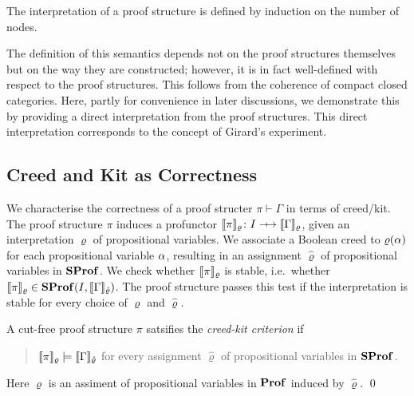 The interpretation of a proof structure is defined by induction on the number of nodes.

The definition of this semantics depends not on the proof structures themselves but on the way they are constructed; however, it is in fact well-defined with respect to the proof structures. This follows from the coherence of compact closed categories. Here, partly for convenience in later discussions, we demonstrate this by providing a direct interpretation from the proof structures. This direct interpretation corresponds to the concept of Girard's experiment.


\subsection{Creed and Kit as Correctness}
We characterise the correctness of a proof structer \( \pi \vdash \Gamma \) in terms of creed/kit.
The proof structure \( \pi \) induces a profunctor \( \sem{\pi}_\varrho \colon I \profarrow \sem{\Gamma}_\varrho \), given an interpretation \( \varrho \) of propositional variables.
We associate a Boolean creed to \( \varrho(\alpha) \) for each propositional variable \( \alpha \), resulting in an assignment \( \hat{\varrho} \) of propositional variables in \( \mathbf{SProf} \).
We check whether \( \llbracket{\pi}\rrbracket_\varrho \) is stable, i.e.~whether \( \llbracket{\pi}\rrbracket_\varrho \in \mathbf{SProf}(I, \llbracket{\Gamma}\rrbracket_{\hat{\varrho}}) \).
The proof structure passes this test if the interpretation is stable for every choice of \( \varrho \) and \( \hat{\varrho} \).

\begin{definition}
    A cut-free proof structure \( \pi \) satsifies the \emph{creed-kit criterion} if
    \begin{quote}
        \( \llbracket{\pi}\rrbracket_{\varrho} \models \llbracket{\Gamma}\rrbracket_{\hat{\varrho}} \) for every assignment \( \hat{\varrho} \) of propositional variables in \( \mathbf{SProf} \).
    \end{quote}
    Here \( \varrho \) is an assiment of propositional variables in \( \mathbf{Prof} \) induced by \( \hat{\varrho} \).
    \qed
\end{definition}

